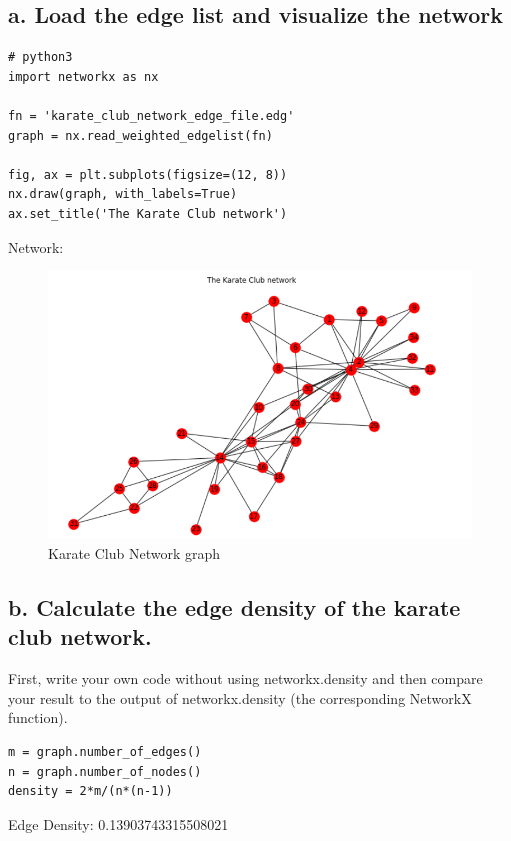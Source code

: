 \documentclass[a4paper,12pt]{article}
\begin{document}
\subsection*{a. Load the edge list and visualize the network}
\begin{lstlisting}
# python3
import networkx as nx

fn = 'karate_club_network_edge_file.edg'
graph = nx.read_weighted_edgelist(fn)

fig, ax = plt.subplots(figsize=(12, 8))
nx.draw(graph, with_labels=True)
ax.set_title('The Karate Club network')
\end{lstlisting}
Network:
\begin{figure}[!ht]
	\begin{center}
    \includegraphics[scale=0.8]{graph_karate.png}
    \caption{Karate Club Network graph}
	\label{fig:graph2}
	\end{center}
\end{figure}

\subsection*{b. Calculate the edge density of the karate club network.}
First, write your own code without using networkx.density and then compare your result to the output of networkx.density (the corresponding NetworkX function).
\begin{lstlisting}
m = graph.number_of_edges()
n = graph.number_of_nodes()
density = 2*m/(n*(n-1))
\end{lstlisting}
Edge Density: 0.13903743315508021
\end{document}
